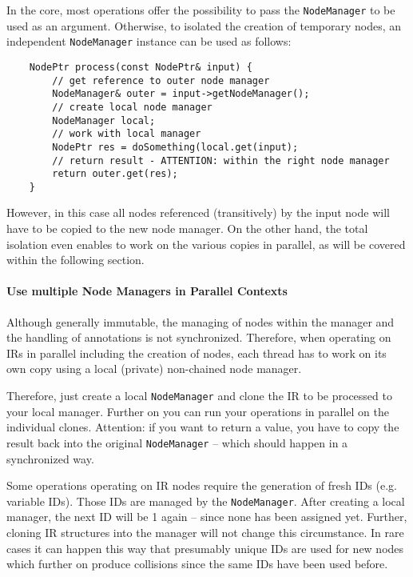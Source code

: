 In the core, most operations offer the possibility to pass the \texttt{NodeManager} to be
used as an argument. Otherwise, to isolated the creation of temporary nodes, an
independent \texttt{NodeManager} instance can be used as follows:
\begin{lstlisting}
	NodePtr process(const NodePtr& input) {
		// get reference to outer node manager
		NodeManager& outer = input->getNodeManager();
		// create local node manager
		NodeManager local;
		// work with local manager
		NodePtr res = doSomething(local.get(input);
		// return result - ATTENTION: within the right node manager
		return outer.get(res);
	}
\end{lstlisting}
However, in this case all nodes referenced (transitively) by the input node will
have to be copied to the new node manager. On the other hand, the total
isolation even enables to work on the various copies in parallel, as will be
covered within the following section.

\paragraph{Use multiple Node Managers in Parallel Contexts}
Although generally immutable, the managing of nodes within the manager and the
handling of annotations is not synchronized.  Therefore, when operating on IRs in
parallel including the creation of nodes, each thread has to work on its own
copy using a local (private) non-chained node manager. 

Therefore, just create a local \texttt{NodeManager} and clone the IR to be processed to
your local manager. Further on you can run your operations in parallel on the
individual clones. Attention: if you want to return a value, you have to copy
the result back into the original \texttt{NodeManager} -- which should happen in a
synchronized way.

Some operations operating on IR nodes require the generation of fresh IDs (e.g.
variable IDs). Those IDs are managed by the \texttt{NodeManager}. After creating a local
manager, the next ID will be 1 again -- since none has been assigned yet.
Further, cloning IR structures into the manager will not change this
circumstance. In rare cases it can happen this way that presumably unique IDs
are used for new nodes which further on produce collisions since the same IDs
have been used before.

